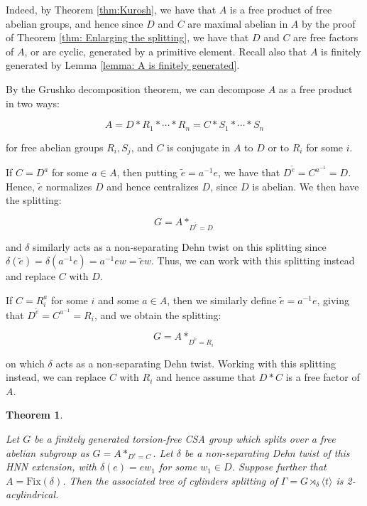 \documentclass{amsart}
\theoremstyle{plain}
\newtheorem{thm}{Theorem}[section]
\theoremstyle{definition}
\theoremstyle{remark}
\begin{document}
Indeed, by Theorem \ref{thm:Kurosh}, we have that $A$ is a free product of free abelian groups, and hence since $D$ and $C$ are maximal abelian in $A$ by the proof of Theorem \ref{thm: Enlarging the splitting}, we have that $D$ and $C$ are free factors of $A$, or are cyclic, generated by a primitive element. Recall also that $A$ is finitely generated by Lemma \ref{lemma: A is finitely generated}.

By the Grushko decomposition theorem, we can decompose $A$ as a free product in two ways: 

$$A = D * R_1 * \cdots * R_n = C * S_1 * \cdots * S_n$$

for free abelian groups $R_i, S_j$, and $C$ is conjugate in $A$ to $D$ or to $R_i$ for some $i$. 

If $C = D^a$ for some $a \in A$, then putting $\tilde{e} = a^{-1}e$, we have that $D^{\tilde{e}} = C^{a^{-1}} = D$. Hence, $\tilde{e}$ normalizes $D$ and hence centralizes $D$, since $D$ is abelian. We then have the splitting: 

$$G = A*_{D^{\tilde{e}} = D}$$

and $\delta$ similarly acts as a non-separating Dehn twist on this splitting since $\delta(\tilde{e}) = \delta(a^{-1}e) = a^{-1}ew = \tilde{e}w$. Thus, we can work with this splitting instead and replace $C$ with $D$. 

If $C = R_i^a$ for some $i$ and some $a \in A$, then we similarly define $\tilde{e} = a^{-1}e$, giving that $D^{\tilde{e}} = C^{a^{-1}} = R_i$, and we obtain the splitting: 

$$G = A*_{D^{\tilde{e}} = R_i}$$

on which $\delta$ acts as a non-separating Dehn twist. Working with this splitting instead, we can replace $C$ with $R_i$ and hence assume that $D * C$ is a free factor of $A$. 

\begin{thm}
    \label{thm:tree of cylinders max splitting is acylindrical}

    Let $G$ be a finitely generated torsion-free CSA group which splits over a free abelian subgroup as $G = A*_{D^e=C}$. Let $\delta$ be a non-separating Dehn twist of this HNN extension, with $\delta(e)=ew_1$ for some $w_1 \in D$. Suppose further that $A = \mathrm{Fix}(\delta)$. Then the associated tree of cylinders splitting of $\Gamma = G \rtimes_{\delta} \langle t \rangle$ is 2-acylindrical. 
    
\end{thm}
\end{document}
